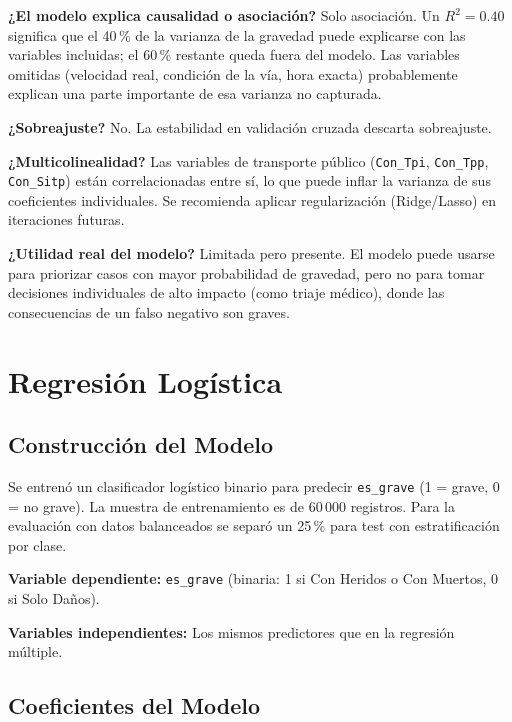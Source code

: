 \documentclass[11pt,a4paper]{article}
\begin{document}
\textbf{¿El modelo explica causalidad o asociación?} Solo asociación. Un $R^2 = 0.40$
significa que el 40\,\% de la varianza de la gravedad puede explicarse con las variables
incluidas; el 60\,\% restante queda fuera del modelo. Las variables omitidas (velocidad
real, condición de la vía, hora exacta) probablemente explican una parte importante de
esa varianza no capturada.

\textbf{¿Sobreajuste?} No. La estabilidad en validación cruzada descarta sobreajuste.

\textbf{¿Multicolinealidad?} Las variables de transporte público (\texttt{Con\_Tpi},
\texttt{Con\_Tpp}, \texttt{Con\_Sitp}) están correlacionadas entre sí, lo que puede
inflar la varianza de sus coeficientes individuales. Se recomienda aplicar regularización
(Ridge/Lasso) en iteraciones futuras.

\textbf{¿Utilidad real del modelo?} Limitada pero presente. El modelo puede usarse para
priorizar casos con mayor probabilidad de gravedad, pero no para tomar decisiones
individuales de alto impacto (como triaje médico), donde las consecuencias de un falso
negativo son graves.

\section{Regresión Logística}

\subsection{Construcción del Modelo}

Se entrenó un clasificador logístico binario para predecir \texttt{es\_grave} (1 = grave,
0 = no grave). La muestra de entrenamiento es de 60\,000 registros. Para la evaluación con
datos balanceados se separó un 25\,\% para test con estratificación por clase.

\textbf{Variable dependiente:} \texttt{es\_grave} (binaria: 1 si Con Heridos o Con
Muertos, 0 si Solo Daños).

\textbf{Variables independientes:} Los mismos predictores que en la regresión múltiple.

\subsection{Coeficientes del Modelo}
\end{document}
